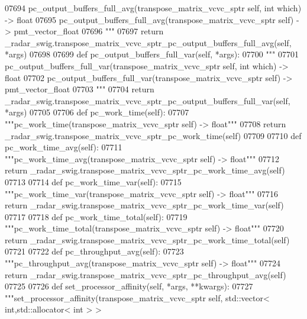 \begin{DoxyCode}
{{{{{{{{{{{{{{{{{{{{{{{{{07694 \textcolor{stringliteral}{        pc\_output\_buffers\_full\_avg(transpose\_matrix\_vcvc\_sptr self, int which) -> float}
07695 \textcolor{stringliteral}{        pc\_output\_buffers\_full\_avg(transpose\_matrix\_vcvc\_sptr self) -> pmt\_vector\_float}
07696 \textcolor{stringliteral}{        """}
07697         \textcolor{keywordflow}{return} \_radar\_swig.transpose\_matrix\_vcvc\_sptr\_pc\_output\_buffers\_full\_avg(self, *args)
07698 
07699     \textcolor{keyword}{def }pc_output_buffers_full_var(self, *args):
07700         \textcolor{stringliteral}{"""}
07701 \textcolor{stringliteral}{        pc\_output\_buffers\_full\_var(transpose\_matrix\_vcvc\_sptr self, int which) -> float}
07702 \textcolor{stringliteral}{        pc\_output\_buffers\_full\_var(transpose\_matrix\_vcvc\_sptr self) -> pmt\_vector\_float}
07703 \textcolor{stringliteral}{        """}
07704         \textcolor{keywordflow}{return} \_radar\_swig.transpose\_matrix\_vcvc\_sptr\_pc\_output\_buffers\_full\_var(self, *args)
07705 
07706     \textcolor{keyword}{def }pc_work_time(self):
07707         \textcolor{stringliteral}{"""pc\_work\_time(transpose\_matrix\_vcvc\_sptr self) -> float"""}
07708         \textcolor{keywordflow}{return} \_radar\_swig.transpose\_matrix\_vcvc\_sptr\_pc\_work\_time(self)
07709 
07710     \textcolor{keyword}{def }pc_work_time_avg(self):
07711         \textcolor{stringliteral}{"""pc\_work\_time\_avg(transpose\_matrix\_vcvc\_sptr self) -> float"""}
07712         \textcolor{keywordflow}{return} \_radar\_swig.transpose\_matrix\_vcvc\_sptr\_pc\_work\_time\_avg(self)
07713 
07714     \textcolor{keyword}{def }pc_work_time_var(self):
07715         \textcolor{stringliteral}{"""pc\_work\_time\_var(transpose\_matrix\_vcvc\_sptr self) -> float"""}
07716         \textcolor{keywordflow}{return} \_radar\_swig.transpose\_matrix\_vcvc\_sptr\_pc\_work\_time\_var(self)
07717 
07718     \textcolor{keyword}{def }pc_work_time_total(self):
07719         \textcolor{stringliteral}{"""pc\_work\_time\_total(transpose\_matrix\_vcvc\_sptr self) -> float"""}
07720         \textcolor{keywordflow}{return} \_radar\_swig.transpose\_matrix\_vcvc\_sptr\_pc\_work\_time\_total(self)
07721 
07722     \textcolor{keyword}{def }pc_throughput_avg(self):
07723         \textcolor{stringliteral}{"""pc\_throughput\_avg(transpose\_matrix\_vcvc\_sptr self) -> float"""}
07724         \textcolor{keywordflow}{return} \_radar\_swig.transpose\_matrix\_vcvc\_sptr\_pc\_throughput\_avg(self)
07725 
07726     \textcolor{keyword}{def }set_processor_affinity(self, *args, **kwargs):
07727         \textcolor{stringliteral}{"""set\_processor\_affinity(transpose\_matrix\_vcvc\_sptr self, std::vector< int,std::allocator< int > >
}}}}}}}}}}}}}}}}}}}}}}}}}}
\end{DoxyCode}
